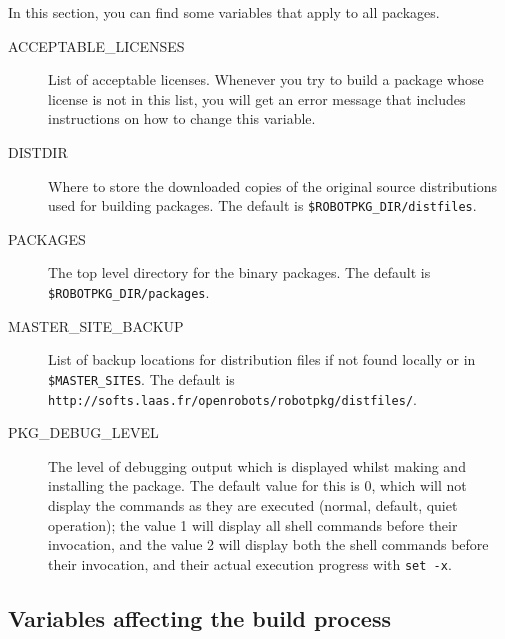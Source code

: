 In  this  section,  you can   find some  variables   that apply  to  all \robotpkg
packages.


\begin{description}
   \item[ACCEPTABLE\_LICENSES] List of acceptable licenses. Whenever you try to
   build a package  whose license is  not in this  list, you will get  an error
   message that includes instructions on how to change this variable.

   \item[DISTDIR] Where to store the downloaded copies of the original source
   distributions used for building \robotpkg packages. The default is
   {\tt \${ROBOTPKG\_DIR}/distfiles}.

   \item[PACKAGES] The top level directory for the binary packages. The default
   is  {\tt \${ROBOTPKG\_DIR}/packages}.


   \item[MASTER\_SITE\_BACKUP] List  of backup locations for distribution files
   if not found locally  or  in {\tt \${MASTER\_SITES}}.  The default  is\\
   {\tt http://softs.laas.fr/openrobots/robotpkg/distfiles/}.

   \item[PKG\_DEBUG\_LEVEL] The  level of debugging  output  which is displayed
   whilst making and installing the package.  The  default value for this is 0,
   which will not  display the commands as they  are executed (normal, default,
   quiet  operation); the value 1 will  display all shell commands before their
   invocation,  and  the value  2 will  display both the  shell commands before
   their invocation, and their actual execution progress with {\tt set -x}.
\end{description}


\subsection{Variables affecting the build process} %

